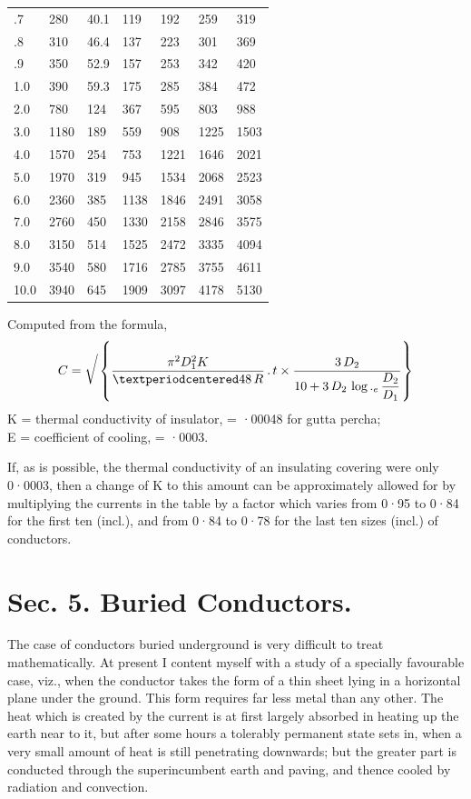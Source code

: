 \documentclass[12pt,oneside]{book}[2021/10/04]
\newcommand{\bigsurd}{\sqrt{\vphantom{\frac{A}{B}}}}
\newcommand{\ldot}{\,.\,}
\begin{document}
\begin{table}[H]
\begin{tabular}{|j{2.1}|j{4.0}|j{3.1}|j{4.1}|j{4.1}|j{4.1}|j{4.1}|}
  .7 &  280 &  40.1 &  119 &  192 &   259 &  319 \\
  .8 &  310 &  46.4 &  137 &  223 &   301 &  369 \\
  .9 &  350 &  52.9 &  157 &  253 &   342 &  420 \\
 1.0 &  390 &  59.3 &  175 &  285 &   384 &  472 \\
 2.0 &  780 & 124 &    367 &  595 &   803 &  988 \\
 3.0 & 1180 & 189 &    559 &  908 &  1225 & 1503 \\
 4.0 & 1570 & 254 &    753 & 1221 &  1646 & 2021 \\
 5.0 & 1970 & 319 &    945 & 1534 &  2068 & 2523 \\
 6.0 & 2360 & 385 &   1138 & 1846 &  2491 & 3058 \\
 7.0 & 2760 & 450 &   1330 & 2158 &  2846 & 3575 \\
 8.0 & 3150 & 514 &   1525 & 2472 &  3335 & 4094 \\
 9.0 & 3540 & 580 &   1716 & 2785 &  3755 & 4611 \\
10.0 & 3940 & 645 &   1909 & 3097 &  4178 & 5130 \\ [5pt]
\hline
\end{tabular}
\end{table}
\normalsize
\noindent
Computed from the formula,
\[
C= \bigsurd \left\{ \frac{\pi^2 D_{1}^2 K}{·48 \, R} \ldot t \times \frac{3\, D_{2}}{10 + 3 \, D_{2} \,\log._{e}\,\dfrac{D_{2}}{D_{1}}}\right\}
\]
K = thermal conductivity of insulator, = ·00048 for gutta percha;\\
E = coefficient of cooling, = ·0003.

If, as is possible, the thermal conductivity of an insulating
covering were only 0·0003, then a change of K to this amount
can be approximately allowed for by multiplying the currents in
the table by a factor which varies from 0·95 to 0·84 for the first
ten (incl.), and from 0·84 to 0·78 for the last ten sizes (incl.) of
conductors.

\section*{Sec. 5. Buried Conductors.}

The case of conductors buried underground is very difficult to
treat mathematically. At present I content myself with a study
of a specially favourable case, viz., when the conductor takes the
form of a thin sheet lying in a horizontal plane under the ground.
This form requires far less metal than any other. The heat which
is created by the current is at first largely absorbed in heating up
the earth near to it, but after some hours a tolerably permanent
state sets in, when a very small amount of heat is still penetrating
downwards; but the greater part is conducted through the
superincumbent earth and paving, and thence cooled by radiation
and convection.
\end{document}
